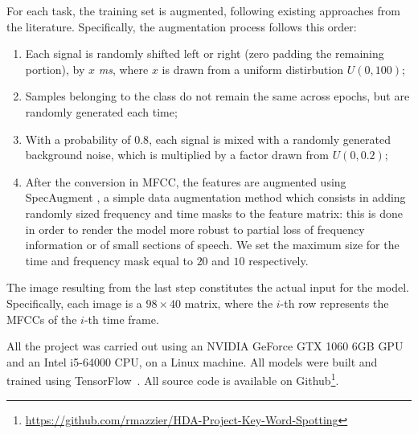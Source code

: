 For each task, the training set is augmented, following existing approaches from the literature. Specifically, the augmentation process follows this order:
\begin{enumerate}
	\item Each signal is randomly shifted left or right (zero padding the remaining portion), by $x$ \textit{ms}, where $x$ is drawn from a uniform distirbution $U(0,100)$;
	\item Samples belonging to the  class do not remain the same across epochs, but are randomly generated each time;
	\item With a probability of $0.8$, each signal is mixed with a randomly generated background noise, which is multiplied by a factor drawn from $U(0,0.2)$; 
	\item After the conversion in MFCC, the features are augmented using SpecAugment \cite{park2019specaugment}, a simple data augmentation method which consists in adding randomly sized frequency and time masks to the feature matrix: this is done in order to render the model more robust to partial loss of frequency information or of small sections of speech. We set the maximum size for the time and frequency mask equal to $20$ and $10$ respectively.
\end{enumerate}

The image resulting from the last step constitutes the actual input for the model. Specifically, each image is a $98 \times 40$ matrix, where the $i$-th row represents the MFCCs of the $i$-th time frame. 


All the project was carried out using an NVIDIA GeForce GTX 1060 6GB GPU and an Intel i5-64000 CPU, on a Linux machine. All models were built and trained using TensorFlow~\cite{Abadi2016TensorFlowAS}. All source code is available on Github\footnote{\url{https://github.com/rmazzier/HDA-Project-Key-Word-Spotting}}.

